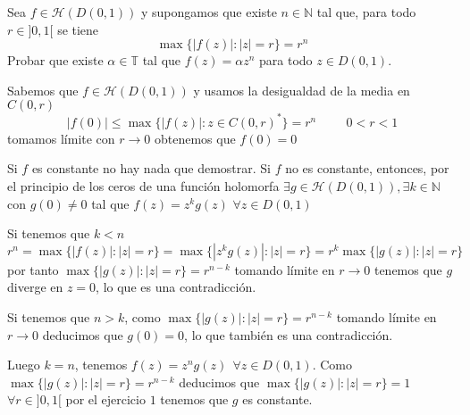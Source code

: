 \begin{ejer}
	Sea $f\in\mathcal{H}(D(0,1))$ y supongamos que existe $n\in\mathbb{N}$ tal que, para todo $r\in ]0,1[$ se tiene
	$$ \max \{ |f(z)| : |z|=r \} = r^n $$
	Probar que existe $\alpha\in\mathbb{T}$ tal que $f(z)=\alpha z^n$ para todo $z\in D(0,1)$.
\end{ejer}
\begin{sol}
Sabemos que $f\in\mathcal{H}(D(0,1))$ y usamos la desigualdad de la media en $C(0,r)$ 
$$|f(0)| \leq \max\{ |f(z)| : z\in C(0,r)^{\ast} \} = r^n \hspace{1cm} 0<r<1$$
tomamos límite con $r\rightarrow 0$ obtenemos que $f(0)=0$

Si $f$ es constante no hay nada que demostrar.
Si $f$ no es constante, entonces, por el principio de los ceros de una función holomorfa $\exists g\in\mathcal{H}(D(0,1)), \exists k\in\mathbb{N}$ con $g(0) \not=0$ tal que $f(z) = z^kg(z)$ $\forall z\in D(0,1)$

Si tenemos que $k<n$
$$r^n = \max\{ |f(z)| : |z|=r \} = \max\{ |z^kg(z)| : |z|=r \} = r^k \max\{ |g(z)| : |z|=r \}$$
por tanto
$\max\{ |g(z)| : |z|=r \} = r^{n-k}$ tomando límite en $r\rightarrow0$ tenemos que $g$ diverge en $z=0$, lo que es una contradicción.

Si tenemos que $n>k$,
como $\max\{ |g(z)| : |z|=r \} = r^{n-k}$ tomando límite en $r\rightarrow 0$ deducimos que $g(0)=0$, lo que también es una contradicción.

Luego $k=n$, tenemos $f(z)=z^ng(z) \ \ \forall z\in D(0,1)$. Como $\max\{ |g(z)| : |z|=r \} = r^{n-k}$ deducimos que $\max\{ |g(z)| : |z|=r \} = 1$ $\forall r\in]0,1[$
por el ejercicio $1$ tenemos que $g$ es constante.



\begin{comment}
	ENUNCIADO
	Si $f\in\mathbb{H}(\mathbb{C})$ y es inyectiva, ¿Qué se puede decir de $f$?
	
	SOLUCIÓN
	Como $f$ es entera tenemos que $f(z) = \sum_{n=0}^{\infty} \frac{f^{(n)}(0)}{n!}z^n \forall z\in\mathbb{C}$
	
	Si $f$ es un polinomio de grado $k$
	si $k\geq 2$ el teorema fundamental del álgebra nos dice que $f$ tiene al menos $2$ ceros (contando multiplicidad), los ceros no pueden ser distintos porque $f$ es inyectiva, por tanto $f$ tiene un cero de orden al menos $2$.
	
	$f$ no es inyectiva en un entorno de un punto donde se anule la derivada, por tanto tenemos una contradicción ya que $f$ es inyectiva.
	
	Si $f$ es entera no polinómica, como consecuencia del teorema de Casorati $f(\mathbb{C}\backslash\overline{D}(0,R))$ es denso en $\mathbb{C}$
	
	Por el teorema de la aplicación abierta sabemos que $f(D(0,r))$
	Entonces hay dos puntos donde la función vale lo mismo, por tanto no puede ser inyectiva.
	
\end{comment}
\end{sol}

